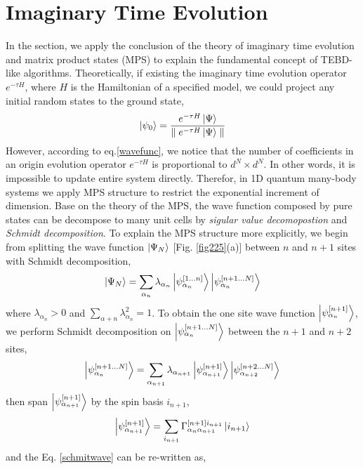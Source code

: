 \section{Imaginary Time Evolution}
\label{ite}
In the section, we apply the conclusion of the theory of imaginary time evolution and matrix product states (MPS) \cite{} to explain the fundamental concept of TEBD-like algorithms. Theoretically, if existing the imaginary time evolution operator $e^{-\tau H}$, where $H$ is the Hamiltonian of a specified model, we could project any initial random states to the ground state,
\begin{align}
	\label{mapgroud}
	\Ket{\psi_0} = \frac{e^{-\tau H} \Ket{\Psi}}{\parallel e^{-\tau H} \Ket{\Psi}\parallel}
\end{align}
However, according to eq.\ref{wavefunc}, we notice that the number of coefficients in an origin evolution operator $e^{-\tau H}$ is proportional to $d^N \times d^N$. In other words, it is impossible to update entire system directly. Therefor, in 1D quantum many-body systems we apply MPS structure to restrict the exponential increment of dimension. Base on the theory of the MPS, the wave function composed by pure states can be decompose to many unit cells by \textit{sigular value decomopostion} and \textit{Schmidt decomposition}. To explain the MPS structure more explicitly, we begin from splitting the wave function $\Ket{\Psi_N}$ [Fig. \ref{fig225}(a)] between $n$ and $n+1$ sites with Schmidt decomposition, 
\begin{align}
	\label{schmitwave}
	\Ket{\Psi_{N}} = \sum_{\alpha_n} \lambda_{\alpha_n} \Ket{\psi_{\alpha_n}^{[1\dots n]}} \Ket{\psi_{\alpha_n}^{[n+1\dots N]}}
\end{align}
where $\lambda_{\alpha_n} > 0$ and $\sum\limits_{\alpha+n}{\lambda_{\alpha_n}^2 = 1}$. To obtain the one site wave function $\Ket{\psi_{\alpha_n}^{[n+1]}}$, we perform Schmidt decomposition on $\Ket{\psi_{\alpha_n}^{[n+1\dots N]}}$ between the $n+1$ and $n+2$ sites,
\begin{align}
	\Ket{\psi_{\alpha_n}^{[n+1\dots N]}} = \sum_{\alpha_{n+1}} \lambda_{\alpha_{n+1}} \Ket{\psi_{\alpha_{n+1}}^{[n+1]}} \Ket{\psi_{\alpha_{n+2}}^{[n+2\dots N]}}
\end{align}
then span $\Ket{\psi_{\alpha_{n+1}}^{[n+1]}}$ by the spin basis $i_{n+1}$,
\begin{align}
	\Ket{\psi_{\alpha_{n+1}}^{[n+1]}} = \sum_{i_{n+1}}{\Gamma^{[n+1] i_{n+1}}_{\alpha_n \alpha_{n+1}} \Ket{i_{n+1}}}
\end{align}
and the Eq. \ref{schmitwave} can be re-written as, 
